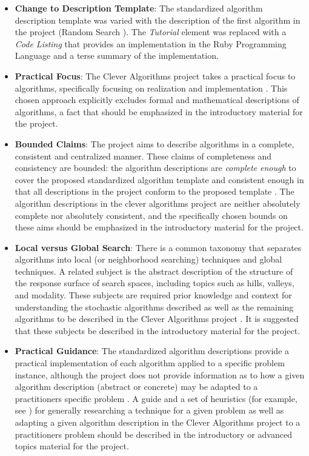 \documentclass[a4paper, 11pt]{article}
\begin{document}
\begin{itemize}
	\item \textbf{Change to Description Template}: The standardized algorithm description template \cite{Brownlee2010a} was varied with the description of the first algorithm in the project (Random Search \cite{Brownlee2010g}). The \emph{Tutorial} element was replaced with a \emph{Code Listing} that provides an implementation in the Ruby Programming Language and a terse summary of the implementation. 	
	\item \textbf{Practical Focus}: The Clever Algorithms project takes a practical focus to algorithms, specifically focusing on realization and implementation \cite{Brownlee2010g}. This chosen approach explicitly excludes formal and mathematical descriptions of algorithms, a fact that should be emphasized in the introductory material for the project. 
	\item \textbf{Bounded Claims}: The project aims to describe algorithms in a complete, consistent and centralized manner. These claims of completeness and consistency are bounded: the algorithm descriptions are \emph{complete enough} to cover the proposed standardized algorithm template and consistent enough in that all descriptions in the project conform to the proposed template \cite{Brownlee2010g}. The algorithm descriptions in the clever algorithms project are neither absolutely complete nor absolutely consistent, and the specifically chosen bounds on these aims should be emphasized in the introductory material for the project.
	\item \textbf{Local versus Global Search}: There is a common taxonomy that separates algorithms into local (or neighborhood searching) techniques and global techniques. A related subject is the abstract description of the structure of the response surface of search spaces, including topics such as hills, valleys, and modality. These subjects are required prior knowledge and context for understanding the stochastic algorithms described as well as the remaining algorithms to be described in the Clever Algorithms project \cite{Brownlee2010h}. It is suggested that these subjects be described in the introductory material for the project.
	\item \textbf{Practical Guidance}: The standardized algorithm descriptions provide a practical implementation of each algorithm applied to a specific problem instance, although the project does not provide information as to how a given algorithm description (abstract or concrete) may be adapted to a practitioners specific problem \cite{Brownlee2010i}. A guide and a set of heuristics (for example, see \cite{Gendreau2003}) for generally researching a technique for a given problem as well as adapting a given algorithm description in the Clever Algorithms project to a practitioners problem should be described in the introductory or advanced topics material for the project.

\end{itemize}
\end{document}
